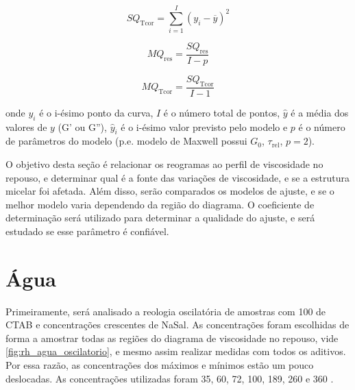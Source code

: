 		\begin{equation}
			SQ_\mathrm{Tcor} = \sum_{i=1}^{I} \left(y_i - \overline{y} \right)^2
			\label{eqn:SQTcor}
		\end{equation}
		
		\begin{equation}
			MQ_\mathrm{res} = \dfrac{SQ_\mathrm{res}}{I-p}
			\label{eqn:MQres}
		\end{equation}
		
		\begin{equation}
			MQ_\mathrm{Tcor} = \dfrac{SQ_\mathrm{Tcor}}{I - 1}
			\label{eqn:MQTcor}
		\end{equation}
		
		\noindent onde \(y_i\) é o i-ésimo ponto da curva, \(I\) é o número total de pontos, \(\hat{y}\) é a média dos valores de \(y\) (G' ou G''), \(\hat{y}_i\) é o i-ésimo valor previsto pelo modelo e \(p\) é o número de parâmetros do modelo (p.e. modelo de Maxwell possui \(G_0\), \(\tau_\mathrm{rel}\), \(p=2\)).
		
		O objetivo desta seção é relacionar os reogramas ao perfil de viscosidade no repouso, e determinar qual é a fonte das variações de viscosidade, e se a estrutura micelar foi afetada. Além disso, serão comparados os modelos de ajuste, e se o melhor modelo varia dependendo da região do diagrama. O coeficiente de determinação será utilizado para determinar a qualidade do ajuste, e será estudado se esse parâmetro é confiável.
		
		\section{Água}
		\label{sec:reologia_oscilatoria_experimental_agua}
		
		Primeiramente, será analisado a reologia oscilatória de amostras com 100 \mM{} de CTAB e concentrações crescentes de NaSal. As concentrações foram escolhidas de forma a amostrar todas as regiões do diagrama de viscosidade no repouso, vide \autoref{fig:rh_agua_oscilatorio}, e mesmo assim realizar medidas com todos os aditivos. Por essa razão, as concentrações dos máximos e mínimos estão um pouco deslocadas. As concentrações utilizadas foram 35, 60, 72, 100, 189, 260 e 360 \mM.

